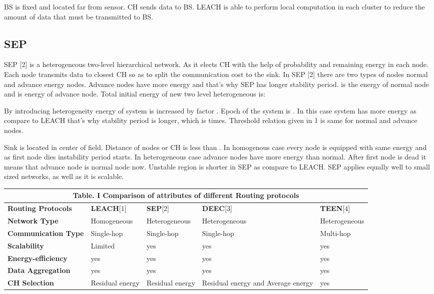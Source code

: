 \documentclass[10pt, conference, compsocconf]{IEEEtran}
\begin{document}
BS is fixed and located far from sensor. CH sends data to BS. LEACH is able to perform local computation in each cluster to reduce the amount of data that must be transmitted to BS.

\subsection{SEP}
SEP [2] is a heterogeneous two-level hierarchical network. As it elects CH with the help of probability and remaining energy in each node. Each node transmits data to closest CH so as to split the communication cost to the sink. In SEP [2] there are two types of nodes normal and advance energy nodes. Advance nodes have more energy and that's why SEP has longer stability period.  is the energy of normal node and  is energy of advance node. Total initial energy of new two level heterogeneous is:



By introducing heterogeneity energy of system is increased by factor .  Epoch of the system is . In this case system has more energy as compare to LEACH that's why stability period is longer, which is  times. Threshold relation given in  1 is same for normal and advance nodes.

Sink is located in center of field. Distance of nodes or CH is less than . In homogenous case every node is equipped with same energy and as first node dies instability period starts. In heterogeneous case advance nodes have more energy than normal. After first node is dead it means that advance node is normal node now. Unstable region is shorter in SEP as compare to LEACH. SEP applies equally well to small sized networks, as well as it is scalable.


\begin{table*}[ht]
 \centering
\begin{tabular}{| p{3cm} || p{2.5cm} || p{2.5cm} || p{2.5cm} || p{2.5cm} |}
  \multicolumn{5}{c}{Table. I Comparison of attributes of different Routing protocols }\\
  \hline
  \textbf{Routing Protocols}     &\textbf{LEACH}[1] &\textbf{SEP}[2]&\textbf{DEEC}[3]  & \textbf{TEEN}[4]  \\ \hline \hline
  \textbf{Network Type }         & Homogeneous      & Heterogeneous & Heterogeneous    & Heterogeneous \\ \hline
  \textbf{Communication Type}    &   Single-hop     & Single-hop    & Single-hop       & Multi-hop  \\ \hline
  \textbf{Scalability}           &	Limited         &  yes          & yes              &  yes       \\ \hline
  \textbf{Energy-efficiency}	 &  yes             & yes           & yes              &  yes        \\ \hline
  \textbf{Data Aggregation}      &  yes             & yes           & yes              & yes          \\ \hline
  \textbf{CH Selection}&  Residual energy & Residual energy& Residual energy and Average energy  & yes\\ \hline


\end{tabular}
\end{table*}
\end{document}
